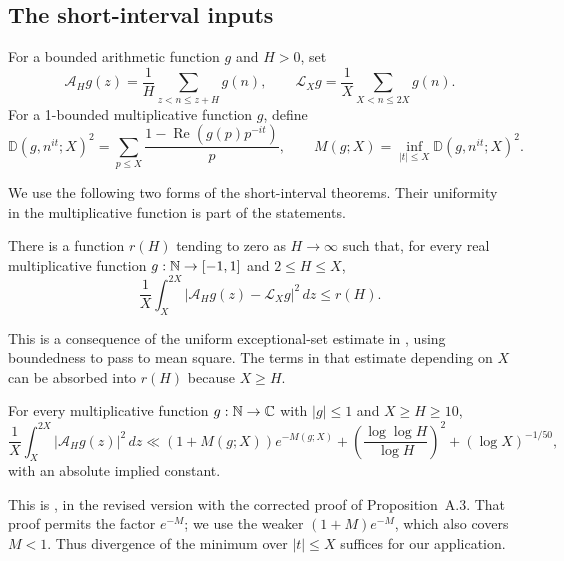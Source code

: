 \subsection{The short-interval inputs}

For a bounded arithmetic function $g$ and $H>0$, set
\[
 \mathcal A_Hg(z)=\frac1H\sum_{z<n\leq z+H}g(n),
 \qquad
 \mathcal L_Xg=\frac1X\sum_{X<n\leq2X}g(n).
\]
For a 1-bounded multiplicative function $g$, define
\begin{equation}\label{eq:labels-distance}
 \mathbb D(g,n^{it};X)^2
 =\sum_{p\leq X}\frac{1-\operatorname{Re}(g(p)p^{-it})}{p},
 \qquad
 M(g;X)=\inf_{|t|\leq X}\mathbb D(g,n^{it};X)^2.
\end{equation}

We use the following two forms of the short-interval theorems.  Their
uniformity in the multiplicative function is part of the statements.

\begin{theorem}
\label{thm:labels-real-MR}
There is a function $r(H)$ tending to zero as $H\to\infty$ such that,
for every real multiplicative function $g:\mathbb N\to[-1,1]$ and
$2\leq H\leq X$,
\begin{equation}\label{eq:labels-real-MR}
 \frac1X\int_X^{2X}
   |\mathcal A_Hg(z)-\mathcal L_Xg|^2\,dz\leq r(H).
\end{equation}
\end{theorem}

This is a consequence of the uniform exceptional-set estimate in
\cite[Theorem~1]{MatomakiRadziwill2016}, using boundedness to pass to
mean square.  The terms in that estimate depending on $X$ can be
absorbed into $r(H)$ because $X\geq H$.

\begin{theorem}
\label{thm:labels-complex-MRT}
For every multiplicative function $g:\mathbb N\to\mathbb C$ with $|g|\leq1$ and
$X\geq H\geq10$,
\begin{equation}\label{eq:labels-complex-quantitative}
 \frac1X\int_X^{2X}|\mathcal A_Hg(z)|^2\,dz
 \ll (1+M(g;X))e^{-M(g;X)}
       +\left(\frac{\log\log H}{\log H}\right)^2
       +(\log X)^{-1/50},
\end{equation}
with an absolute implied constant.
\end{theorem}

This is \cite[Theorem~A.1]{MatomakiRadziwillTao2015}, in the revised
version with the corrected proof of Proposition~A.3.  That proof permits
the factor $e^{-M}$; we use the weaker $(1+M)e^{-M}$, which also covers
$M<1$.  Thus divergence of the minimum over $|t|\leq X$ suffices for
our application.

